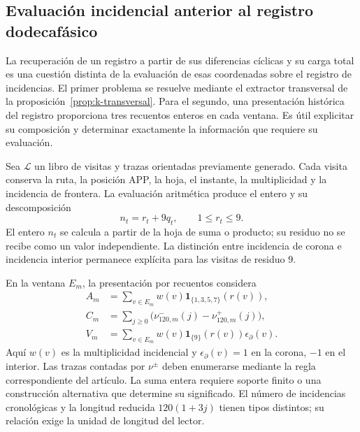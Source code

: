 \subsection{Evaluación incidencial anterior al registro dodecafásico}
\label{subsec:registro-evaluacion-incidencial}

La recuperación de un registro a partir de sus diferencias cíclicas y su
carga total es una cuestión distinta de la evaluación de esas coordenadas
sobre el registro de incidencias. El primer problema se resuelve mediante el
extractor transversal de la proposición~\ref{prop:k-transversal}.
Para el segundo, una presentación histórica del
registro proporciona tres recuentos enteros en cada ventana. Es útil
explicitar su composición y determinar exactamente la información que
requiere su evaluación.

Sea \(\mathscr L\) un libro de visitas y trazas orientadas previamente
generado. Cada visita conserva la ruta, la posición APP, la hoja, el
instante, la multiplicidad y la incidencia de frontera. La evaluación
aritmética produce el entero y su descomposición
\[
 n_t=r_t+9q_t,\qquad 1\leq r_t\leq9.
\]
El entero \(n_t\) se calcula a partir de la hoja de suma o producto; su
residuo no se recibe como un valor independiente. La distinción entre
incidencia de corona e incidencia interior permanece explícita para las
visitas de residuo \(9\).

En la ventana \(E_m\), la presentación por recuentos considera
\begin{align}
 A_m&=\sum_{v\in E_m}w(v)
             \mathbf1_{\{1,3,5,7\}}(r(v)),\\
 C_m&=\sum_{j\geq0}\bigl(\nu^-_{120,m}(j)-\nu^+_{120,m}(j)\bigr),\\
 V_m&=\sum_{v\in E_m}w(v)\mathbf1_{\{9\}}(r(v))\epsilon_\partial(v).
\end{align}
Aquí \(w(v)\) es la multiplicidad incidencial y
\(\epsilon_\partial(v)=1\) en la corona, \(-1\) en el interior.
Las trazas contadas por \(\nu^\pm\) deben enumerarse mediante la regla
correspondiente del artículo. La suma entera requiere soporte finito o una
construcción alternativa que determine su significado. El número de
incidencias cronológicas y la longitud reducida \(120(1+3j)\) tienen
tipos distintos; su relación exige la unidad de longitud del lector.

